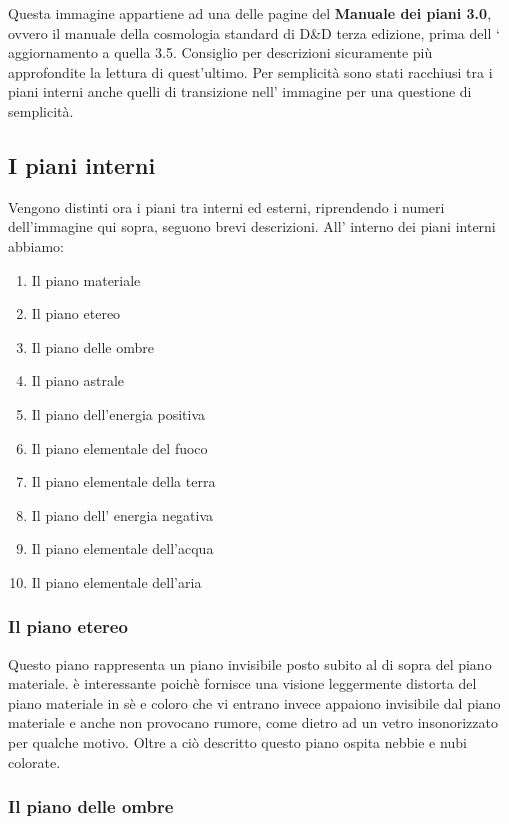 \documentclass[a4paper,12pt]{book}
\begin{document}
Questa immagine appartiene ad una delle pagine del \textbf{Manuale dei piani 3.0}, ovvero il manuale della cosmologia standard di D\&D terza edizione, prima dell ` aggiornamento a quella 3.5.
Consiglio per descrizioni sicuramente più approfondite la lettura di quest'ultimo.
Per semplicità sono stati racchiusi tra i piani interni anche quelli di transizione nell' immagine per una questione di semplicità.

\subsection{I piani interni}

Vengono distinti ora i piani tra interni ed esterni, riprendendo i numeri dell'immagine qui sopra, seguono brevi descrizioni.
All' interno dei piani interni abbiamo:

\begin{enumerate}

\item{Il piano materiale}
\item{Il piano etereo}
\item{Il piano delle ombre}
\item{Il piano astrale}
\item{Il piano dell'energia positiva}
\item{Il piano elementale del fuoco}
\item{Il piano elementale della terra}
\item{Il piano dell' energia negativa}
\item{Il piano elementale dell'acqua}
\item{Il piano elementale dell'aria}

\end{enumerate}

\subsubsection{Il piano etereo}

Questo piano rappresenta un piano invisibile posto subito al di sopra del piano materiale.
è interessante poichè fornisce una visione leggermente distorta del piano materiale in sè e coloro che vi entrano invece appaiono invisibile dal piano materiale e anche non provocano rumore, come dietro ad un vetro insonorizzato per qualche motivo.
Oltre a ciò descritto questo piano ospita nebbie e nubi colorate.

\subsubsection{Il piano delle ombre}
\end{document}
